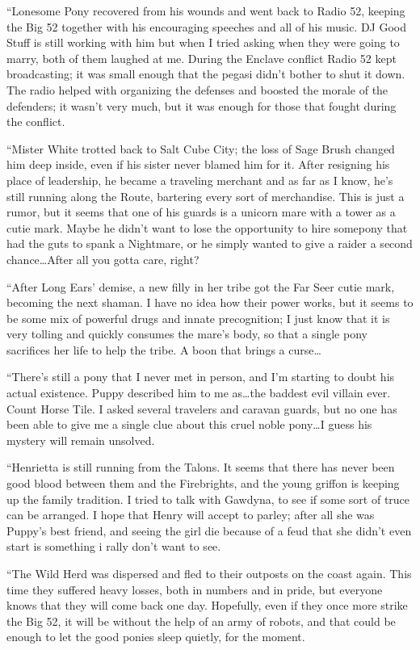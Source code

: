 {``Lonesome Pony recovered from his wounds and went back to Radio 52, keeping the Big 52 together with his encouraging speeches and all of his music. DJ Good Stuff is still working with him but when I tried asking when they were going to marry, both of them laughed at me. During the Enclave conflict Radio 52 kept broadcasting; it was small enough that the pegasi didn't bother to shut it down. The radio helped with organizing the defenses and boosted the morale of the defenders; it wasn't very much, but it was enough for those that fought during the conflict.

``Mister White trotted back to Salt Cube City; the loss of Sage Brush changed him deep inside, even if his sister never blamed him for it. After resigning his place of leadership, he became a traveling merchant and as far as I know, he's still running along the Route, bartering every sort of merchandise. This is just a rumor, but it seems that one of his guards is a unicorn mare with a tower as a cutie mark. Maybe he didn't want to lose the opportunity to hire somepony that had the guts to spank a Nightmare, or he simply wanted to give a raider a second chance\dots After all you gotta care, right?

``After Long Ears' demise, a new filly in her tribe got the Far Seer cutie mark, becoming the next shaman. I have no idea how their power works, but it seems to be some mix of powerful drugs and innate precognition; I just know that it is very tolling and quickly consumes the mare's body, so that a single pony sacrifices her life to help the tribe. A boon that brings a curse\dots

``There's still a pony that I never met in person, and I'm starting to doubt his actual existence. Puppy described him to me as\dots the baddest evil villain ever. Count Horse Tile. I asked several travelers and caravan guards, but no one has been able to give me a single clue about this cruel noble pony\dots I guess his mystery will remain unsolved.

``Henrietta is still running from the Talons. It seems that there has never been good blood between them and the Firebrights, and the young griffon is keeping up the family tradition. I tried to talk with Gawdyna, to see if some sort of truce can be arranged. I hope that Henry will accept to parley; after all she was Puppy's best friend, and seeing the girl die because of a feud that she didn't even start is something i rally don't want to see.

``The Wild Herd was dispersed and fled to their outposts on the coast again. This time they suffered heavy losses, both in numbers and in pride, but everyone knows that they will come back one day. Hopefully, even if they once more strike the Big 52, it will be without the help of an army of robots, and that could be enough to let the good ponies sleep quietly, for the moment.

}
